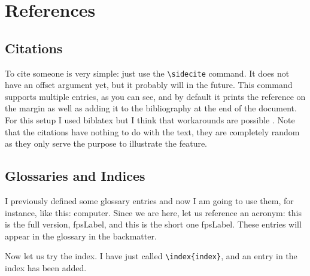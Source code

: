 \renewcommand*{\chapterformat}
{
  \enskip\mbox{\scalebox{4}{\thechapter\autodot}}
}
\renewcommand\chapterlinesformat[3]
{
  \parbox[b]{\textwidth}{\hrulefill#2}\par%
  #3%
  \parbox[b]{\textwidth+\marginparsep+\marginparwidth}{\hrulefill}%
}
\setchapterpreamble[u]{\margintoc}
\chapter{References}

\section{Citations}

To cite someone  is very simple: just 
use the \verb|\sidecite| command. It does not have an offset argument 
yet, but it probably will in the future. This command supports multiple 
entries, as you can see, and by default it prints the reference on the 
margin as well as adding it to the bibliography at the end of the 
document. For this setup I used biblatex but I think that workarounds 
are possible . Note that the citations have nothing 
to do with the text, they are completely random as they only serve the 
purpose to illustrate the feature.

\section{Glossaries and Indices}

I previously defined some glossary entries and now I am going to use 
them, for instance, like this: \gls{computer}. Since we are here, let us 
reference an acronym: this is the full version, \acrfull{fpsLabel}, and 
this is the short one \acrshort{fpsLabel}. These entries will appear in 
the glossary in the backmatter.

Now let us try the index. I have just called 
\verb|\index{index}|, and an entry in the index has been added.
